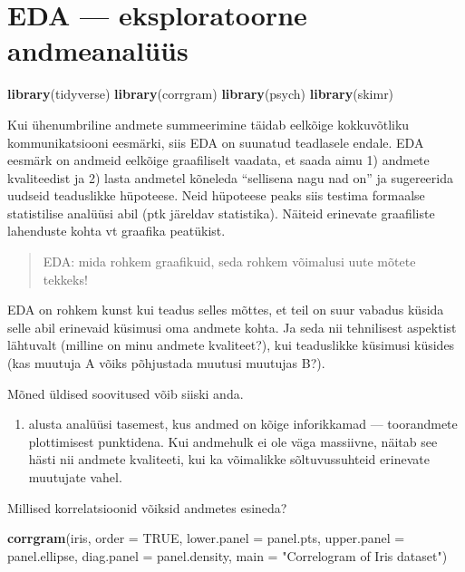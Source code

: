 \documentclass[]{book}
\newenvironment{Shaded}{\begin{snugshade}}{\end{snugshade}}
\newcommand{\KeywordTok}[1]{\textcolor[rgb]{0.13,0.29,0.53}{\textbf{#1}}}
\newcommand{\DataTypeTok}[1]{\textcolor[rgb]{0.13,0.29,0.53}{#1}}
\newcommand{\StringTok}[1]{\textcolor[rgb]{0.31,0.60,0.02}{#1}}
\newcommand{\OtherTok}[1]{\textcolor[rgb]{0.56,0.35,0.01}{#1}}
\newcommand{\NormalTok}[1]{#1}
\providecommand{\tightlist}{%
  \setlength{\itemsep}{0pt}\setlength{\parskip}{0pt}}
\begin{document}
\chapter{EDA --- eksploratoorne
andmeanalüüs}\label{eda-eksploratoorne-andmeanaluus}

\begin{Shaded}
\begin{Highlighting}[]
\KeywordTok{library}\NormalTok{(tidyverse)}
\KeywordTok{library}\NormalTok{(corrgram)}
\KeywordTok{library}\NormalTok{(psych)}
\KeywordTok{library}\NormalTok{(skimr)}
\end{Highlighting}
\end{Shaded}

Kui ühenumbriline andmete summeerimine täidab eelkõige kokkuvõtliku
kommunikatsiooni eesmärki, siis EDA on suunatud teadlasele endale. EDA
eesmärk on andmeid eelkõige graafiliselt vaadata, et saada aimu 1)
andmete kvaliteedist ja 2) lasta andmetel kõneleda ``sellisena nagu nad
on'' ja sugereerida uudseid teaduslikke hüpoteese. Neid hüpoteese peaks
siis testima formaalse statistilise analüüsi abil (ptk järeldav
statistika). Näiteid erinevate graafiliste lahenduste kohta vt graafika
peatükist.

\begin{quote}
EDA: mida rohkem graafikuid, seda rohkem võimalusi uute mõtete tekkeks!
\end{quote}

EDA on rohkem kunst kui teadus selles mõttes, et teil on suur vabadus
küsida selle abil erinevaid küsimusi oma andmete kohta. Ja seda nii
tehnilisest aspektist lähtuvalt (milline on minu andmete kvaliteet?),
kui teaduslikke küsimusi küsides (kas muutuja A võiks põhjustada muutusi
muutujas B?).

Mõned üldised soovitused võib siiski anda.

\begin{enumerate}
\def\labelenumi{\arabic{enumi}.}
\tightlist
\item
  alusta analüüsi tasemest, kus andmed on kõige inforikkamad ---
  toorandmete plottimisest punktidena. Kui andmehulk ei ole väga
  massiivne, näitab see hästi nii andmete kvaliteeti, kui ka võimalikke
  sõltuvussuhteid erinevate muutujate vahel.
\end{enumerate}

Millised korrelatsioonid võiksid andmetes esineda?



\begin{Shaded}
\begin{Highlighting}[]
\KeywordTok{corrgram}\NormalTok{(iris, }
         \DataTypeTok{order =} \OtherTok{TRUE}\NormalTok{, }
         \DataTypeTok{lower.panel =}\NormalTok{ panel.pts,}
         \DataTypeTok{upper.panel =}\NormalTok{ panel.ellipse,}
         \DataTypeTok{diag.panel =}\NormalTok{ panel.density,}
         \DataTypeTok{main =} \StringTok{"Correlogram of Iris dataset"}\NormalTok{)}
\end{Highlighting}
\end{Shaded}
\end{document}
